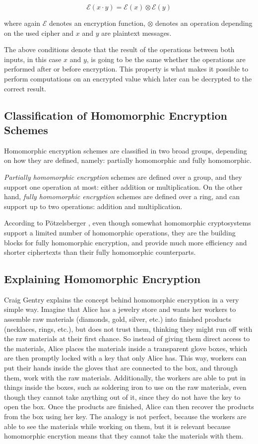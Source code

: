 \[
\mathcal{E}(x \cdot y) = \mathcal{E}(x) \otimes \mathcal{E}(y)
\]

where again $\mathcal{E}$ denotes an encryption function, $\otimes$ denotes an operation depending on the used cipher and $x$ and $y$ are plaintext messages.

The above conditions denote that the result of the operations between both inputs, in this case $x$ and $y$, is going to be the same whether the operations are performed after or before encryption. This property is what makes it possible to perform computations on an encrypted value which later can be decrypted to the correct result.

\subsection{Classification of Homomorphic Encryption Schemes}

Homomorphic encryption schemes are classified in two broad groups, depending on how they are defined, namely: partially homomorphic and fully homomorphic. 

\textit{Partially homomorphic encryption} schemes are defined over a group, and they support one operation at most: either addition or multiplication. On the other hand, \textit{fully homomorphic encryption} schemes are defined over a ring, and can support up to two operations: addition and multiplication.

According to P{\"o}tzelsberger \cite{potzelsberger2013kv}, even though somewhat homomorphic cryptosystems support a limited number of homomorphic operations, they are the building blocks for fully homomorphic encryption, and provide much more efficiency and shorter ciphertexts than their fully homomorphic counterparts. 


\subsection{Explaining Homomorphic Encryption}

Craig Gentry \cite{homoenc} explains the concept behind homomorphic encryption in a very simple way. Imagine that Alice has a jewelry store and wants her workers to assemble raw materials (diamonds, gold, silver, etc.) into finished products (necklaces, rings, etc.), but does not trust them, thinking they might run off with the raw materials at their first chance. So instead of giving them direct access to the materials, Alice places the materials inside a transparent glove boxes, which are then promptly locked with a key that only Alice has. This way, workers can put their hands inside the gloves that are connected to the box, and through them, work with the raw materials. Additionally, the workers are able to put in things inside the boxes, such as soldering iron to use on the raw materials, even though they cannot take anything out of it, since they do not have the key to open the box. Once the products are finished, Alice can then recover the products from the box using her key. The analogy is not perfect, because the workers are able to see the materials while working on them, but it is relevant because homomorphic encrytion means that they cannot take the materials with them.

